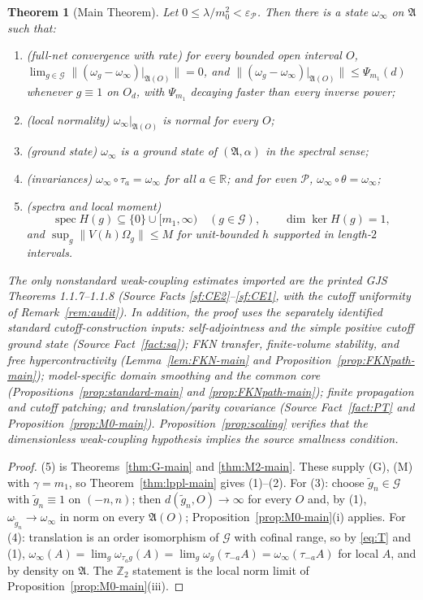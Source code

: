 \documentclass[11pt,a4paper]{article}
\theoremstyle{plain}
\newtheorem{theorem}{Theorem}[section]
\theoremstyle{definition}
\newcommand{\R}{\mathbb{R}}
\newcommand{\Z}{\mathbb{Z}}
\newcommand{\A}{\mathfrak{A}}
\newcommand{\G}{\mathcal{G}}
\newcommand{\Om}{\Omega}
\DeclareMathOperator{\spec}{spec}
\begin{document}
\begin{theorem}[Main Theorem]\label{thm:MAIN}
Let $0\le\lambda/m_0^2<\varepsilon_{\mathscr P}$. Then there is a state $\omega_\infty$ on $\A$
such that:
\begin{enumerate}
\item[\rm(1)] \emph{(full-net convergence with rate)} for every bounded open interval $O$,
      $\lim_{g\in\G}\|(\omega_g-\omega_\infty)|_{\A(O)}\|=0$, and
      $\|(\omega_g-\omega_\infty)|_{\A(O)}\|\le\Psi_{m_1}(d)$ whenever $g\equiv1$ on $O_d$,
      with $\Psi_{m_1}$ decaying faster than every inverse power;
\item[\rm(2)] \emph{(local normality)} $\omega_\infty|_{\A(O)}$ is normal for every $O$;
\item[\rm(3)] \emph{(ground state)} $\omega_\infty$ is a ground state of $(\A,\alpha)$ in the
      spectral sense;
\item[\rm(4)] \emph{(invariances)} $\omega_\infty\circ\tau_a=\omega_\infty$ for all $a\in\R$;
      and for even $\mathscr P$, $\omega_\infty\circ\theta=\omega_\infty$;
\item[\rm(5)] \emph{(spectra and local moment)}
      \[
       \spec H(g)\subseteq\{0\}\cup[m_1,\infty)\quad(g\in\G),
       \qquad \dim\ker H(g)=1,
      \]
      and $\sup_g\|V(h)\Om_g\|\le M$ for unit-bounded $h$ supported in length-$2$ intervals.
\end{enumerate}
The only nonstandard weak-coupling estimates imported are the printed GJS
Theorems 1.1.7--1.1.8 (Source Facts \ref{sf:CE2}--\ref{sf:CE1}, with the cutoff uniformity of
Remark~\ref{rem:audit}). In addition, the proof uses the separately identified standard
cutoff-construction inputs: self-adjointness and the simple positive cutoff ground state
(Source Fact~\ref{fact:sa}); FKN transfer, finite-volume stability, and free
hypercontractivity (Lemma~\ref{lem:FKN-main} and Proposition~\ref{prop:FKNpath-main});
model-specific domain smoothing and the common core
(Propositions~\ref{prop:standard-main} and \ref{prop:FKNpath-main}); finite propagation and
cutoff patching; and translation/parity covariance (Source Fact~\ref{fact:PT} and
Proposition~\ref{prop:M0-main}). Proposition~\ref{prop:scaling} verifies that the dimensionless
weak-coupling hypothesis implies the source smallness condition.
\end{theorem}

\begin{proof}
(5) is Theorems~\ref{thm:G-main} and \ref{thm:M2-main}. These supply (G), (M) with
$\gamma=m_1$, so Theorem~\ref{thm:lppl-main} gives (1)--(2). For (3): choose
$\widetilde g_n\in\G$ with $\widetilde g_n\equiv1$ on $(-n,n)$; then $d(\widetilde g_n,O)\to\infty$
for every $O$ and, by (1), $\omega_{\widetilde g_n}\to\omega_\infty$ in norm on every $\A(O)$;
Proposition~\ref{prop:M0-main}(i) applies. For (4): translation is an order isomorphism of
$\G$ with cofinal range, so by \eqref{eq:T} and (1),
$\omega_\infty(A)=\lim_g\omega_{\tau_ag}(A)=\lim_g\omega_g(\tau_{-a}A)
=\omega_\infty(\tau_{-a}A)$ for local $A$, and by density on $\A$. The $\Z_2$ statement is the
local norm limit of Proposition~\ref{prop:M0-main}(iii).
\end{proof}
\end{document}
